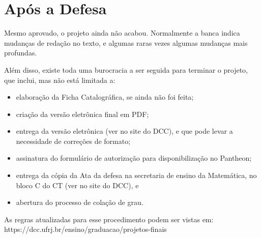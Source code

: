


\chapter{Após a Defesa}

Mesmo aprovado, o projeto ainda não acabou. Normalmente a banca indica mudanças de redação no texto, e algumas raras vezes algumas mudanças mais profundas.

Além disso, existe toda uma burocracia a ser seguida para terminar o projeto, que inclui, mas não está limitada a:
\begin{itemize}
\item elaboração da Ficha Catalográfica, se ainda não foi feita;
\item criação da versão eletrônica final em PDF;
\item entrega da versão eletrônica (ver no site do DCC), e que pode levar a necessidade de correções de formato;
\item assinatura do formulário de autorização para disponibilização no Pantheon;
\item entrega da cópia da Ata da defesa na secretaria de ensino da Matemática, no bloco C do CT (ver no site do DCC), e
\item abertura do processo de colação de grau.
\end{itemize}


As regras atualizadas para esse procedimento podem ser vistas em:
https://dcc.ufrj.br/ensino/graduacao/projetos-finais









